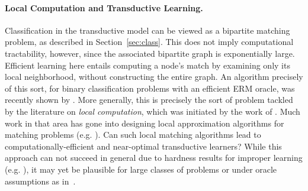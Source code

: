 \paragraph{Local Computation and Transductive Learning.} Classification in the transductive model can be viewed as a bipartite matching problem, as described in Section~\ref{sec:class}. This does not imply computational tractability, however, since the associated bipartite graph is exponentially large. Efficient learning here entails computing a node's match by examining only its local neighborhood, without constructing the entire graph. An algorithm precisely of this sort, for binary classification problems with an efficient ERM oracle, was recently shown by \citet{daskalakis_is_2024}. More generally, this is precisely the sort of problem tackled by the literature on \emph{local computation}, which was initiated by the work of \citet{rubinfeld_fast_2011}. Much work in that area has gone into designing local approximation algorithms for matching problems (e.g. \cite{kapralov_space_2020,levi_local_2015}). Can such local matching algorithms lead to computationally-efficient and near-optimal transductive learners? While this approach can not succeed in general due to hardness results for improper learning (e.g. \cite{daniely_local_2021,tiegel_improved_2024}), it may yet be plausible for large classes of  problems or under oracle assumptions as in~\cite{daskalakis_is_2024}.  %


